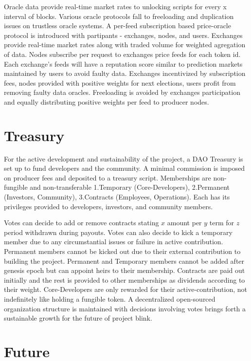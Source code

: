 \documentclass[a4paper,10pt]{article}
\begin{document}
Oracle data provide real-time market rates to unlocking scripts for every x interval of blocks. Various oracle protocols fall to freeloading and duplication issues on trustless oracle systems. A per-feed subscription based price-oracle protocol is introduced with partipants - exchanges, nodes, and users. Exchanges provide real-time market rates along with traded volume for weighted agregation of data. Nodes subscribe per request to exchanges price feeds for each token id. Each exchange's feeds will have a reputation score similar to prediction markets maintained by users to avoid faulty data. Exchanges incentivized by subscription fees, nodes provided with positive weights for next elections, users profit from removing faulty data oracles. Freeloading is avoided by exchanges participation and equally distributing positive weights per feed to producer nodes. 

\section{Treasury}
For the active development and sustainability of the project, a DAO Treasury is set up to fund developers and the community. A minimal commission is imposed on producer fees and deposited to a treasury script. Memberships are non-fungible and non-transferable 1.Temporary (Core-Developers), 2.Permanent (Investors, Community), 3.Contracts (Employees, Operations). Each has its privileges provided to developers, investors, and community members. 

Votes can decide to add or remove contracts stating $x$ amount per $y$ term for $z$ period withdrawn during payouts. Votes can also decide to kick a temporary member due to any circumstantial issues or failure in active contribution. Permanent members cannot be kicked out due to their external contribution to building the project. Permanent and Temporary members cannot be added after genesis epoch but can appoint heirs to their membership. Contracts are paid out initially and the rest is provided to other memberships as dividends according to their weight. Core-Developers are only rewarded for their active-contribution, not indefinitely like holding a fungible token. A decentralized open-sourced organization structure is maintained with decisions involving votes brings forth a sustainable growth for the future of project blink. 
\section{Future}
\end{document}
